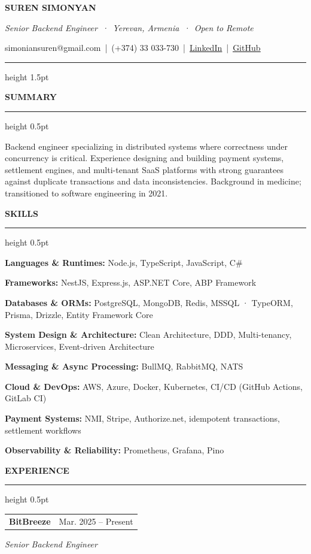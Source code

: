 \documentclass[a4paper]{article}
\makeatletter
\newcommand{\nameText}[1]{%
  {\centering\fontsize{19pt}{20pt}\selectfont\bfseries #1\par}%
}
\newcommand{\headlineText}[1]{%
  {\centering\fontsize{10pt}{12pt}\selectfont\itshape\color{dategray} #1\par}%
}
\newcommand{\contactText}[1]{%
  {\centering\fontsize{8.5pt}{10.5pt}\selectfont #1\par}%
}
\newcommand{\profileText}[1]{%
  {\fontsize{8.5pt}{9.9pt}\selectfont #1\par}%
}
\newcommand{\firstSeperator}[1]{%
  \vspace{0.4pt}%
  \hrule height 1.5pt%
  \vspace{7.0pt}%
}
\newcommand{\sectionTitle}[1]{%
  \vspace{9pt}%
  {\fontsize{9.5pt}{11.5pt}\selectfont\bfseries #1\par}%
  \vspace{3pt}%
  \hrule height 0.5pt%
  \vspace{7.84pt}%
}
\newcommand{\linkedText}[2]{%
  \href{#1}{\textcolor{linkblue}{\uline{#2}}}%
}
\newcommand{\skill}[2]{%
  {\fontsize{8.5pt}{10.9pt}\selectfont\textbf{#1:} #2\par}%
}
\newcommand{\company}[2]{%
	\begin{tabularx}{\textwidth}{@{}Xr@{}}
		{\fontsize{9.5pt}{11.5pt}\selectfont\bfseries #1} &
		{\fontsize{9pt}{11pt}\selectfont\color{dategray} #2} \\
	\end{tabularx}%
	\vspace{0pt}%
}
\newcommand{\role}[1]{%
  {\fontsize{9pt}{10.5pt}\selectfont\itshape\color{dategray} #1\par}%
  \vspace{1.7pt}%
}
\makeatother
\begin{document}
\nameText{SUREN SIMONYAN}
\vspace{3.35pt}
\headlineText{Senior Backend Engineer \,·\, Yerevan, Armenia \,·\, Open to Remote}
\vspace{1.8pt}
\contactText{simoniansuren@gmail.com \,|\, (+374) 33 033-730 \,|\, \linkedText{https://www.linkedin.com/in/suren-simonyan/}{LinkedIn} \,|\, \linkedText{https://github.com/SimonyanSuren}{GitHub}}

\vspace{15.72pt}

\firstSeperator{}

\sectionTitle{SUMMARY}
\profileText{Backend engineer specializing in distributed systems where correctness under concurrency is critical. 
Experience designing and building payment systems, settlement engines, and multi-tenant SaaS platforms with strong 
guarantees against duplicate transactions and data inconsistencies. Background in medicine; transitioned to software engineering in 2021.}

\sectionTitle{SKILLS}
\skill{Languages \& Runtimes}{Node.js, TypeScript, JavaScript, C\#}
\skill{Frameworks}{NestJS, Express.js, ASP.NET Core, ABP Framework}
\skill{Databases \& ORMs}{PostgreSQL, MongoDB, Redis, MSSQL · TypeORM, Prisma, Drizzle, Entity Framework Core}                                              
\skill{System Design \& Architecture}{Clean Architecture, DDD, Multi-tenancy, Microservices, Event-driven Architecture}
\skill{Messaging \& Async Processing}{BullMQ, RabbitMQ, NATS}
\skill{Cloud \& DevOps}{AWS, Azure, Docker, Kubernetes, CI/CD (GitHub Actions, GitLab CI)}
\skill{Payment Systems}{NMI, Stripe, Authorize.net, idempotent transactions, settlement workflows}
\skill{Observability \& Reliability}{Prometheus, Grafana, Pino}
                                                      
\sectionTitle{EXPERIENCE}
\company{BitBreeze}{Mar. 2025 – Present}
\role{Senior Backend Engineer}
\end{document}
